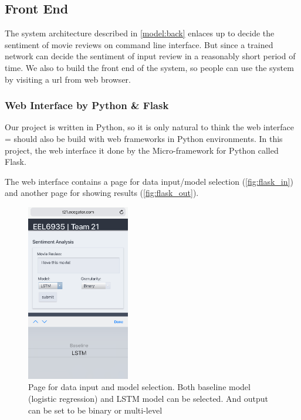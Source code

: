 \documentclass[conference]{IEEEtran}
\begin{document}
\subsection{Front End}
\label{model:front}
    
    The system architecture described in \autoref{model:back} enlaces up to decide the
    sentiment of movie reviews on command line interface. But since a trained network can
    decide the sentiment of input review in a reasonably short period of time. We also
    to build the front end of the system, so people can use the system by visiting a
    url from web browser.
    
\subsubsection{Web Interface by Python \& Flask}
\label{model:front:web}
    Our project is written in Python, so it is only natural to think the web interface =
    should also be build with web frameworks in Python environments. 
    In this project, the web interface it done by the Micro-framework for 
    Python called Flask\cite{ronacher2010flask,grinberg2018flask}.
    
    The web interface contains a page for data input/model selection 
    (\autoref{fig:flask_in}) and another page for
    showing results (\autoref{fig:flask_out}).
    
    \begin{figure}
        \center\includegraphics[width=0.4\textwidth]{figure/flask_input}
        \caption{Page for data input and model selection. Both baseline model (logistic
        regression) and LSTM model can be selected. And output can be set to be binary 
        or multi-level}
        \label{fig:flask_in}
    \end{figure}
    
\end{document}
